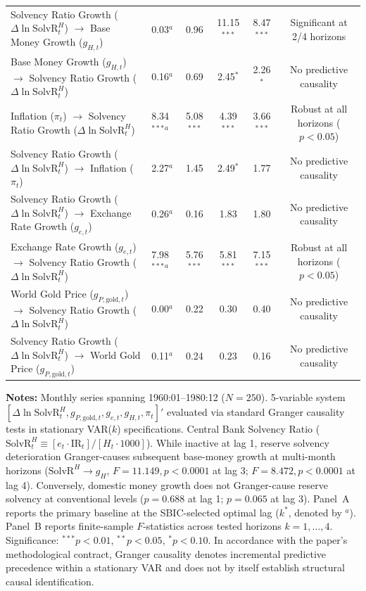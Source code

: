 \begin{table}[htbp]
{\begin{tabular}{llccccc}
\midrule
Solvency Ratio Growth ($\Delta \ln \text{SolvR}_t^H$) $\to$ Base Money Growth ($g_{H,t}$) & 0.03$^a$ & 0.96 & 11.15$^{***}$ & 8.47$^{***}$ & \multicolumn{2}{c}{Significant at 2/4 horizons} \\
Base Money Growth ($g_{H,t}$) $\to$ Solvency Ratio Growth ($\Delta \ln \text{SolvR}_t^H$) & 0.16$^a$ & 0.69 & 2.45$^{*}$ & 2.26$^{*}$ & \multicolumn{2}{c}{No predictive causality} \\
Inflation ($\pi_t$) $\to$ Solvency Ratio Growth ($\Delta \ln \text{SolvR}_t^H$) & 8.34$^{***}$$^a$ & 5.08$^{***}$ & 4.39$^{***}$ & 3.66$^{***}$ & \multicolumn{2}{c}{Robust at all horizons ($p < 0.05$)} \\
Solvency Ratio Growth ($\Delta \ln \text{SolvR}_t^H$) $\to$ Inflation ($\pi_t$) & 2.27$^a$ & 1.45 & 2.49$^{*}$ & 1.77 & \multicolumn{2}{c}{No predictive causality} \\
Solvency Ratio Growth ($\Delta \ln \text{SolvR}_t^H$) $\to$ Exchange Rate Growth ($g_{e,t}$) & 0.26$^a$ & 0.16 & 1.83 & 1.80 & \multicolumn{2}{c}{No predictive causality} \\
Exchange Rate Growth ($g_{e,t}$) $\to$ Solvency Ratio Growth ($\Delta \ln \text{SolvR}_t^H$) & 7.98$^{***}$$^a$ & 5.76$^{***}$ & 5.81$^{***}$ & 7.15$^{***}$ & \multicolumn{2}{c}{Robust at all horizons ($p < 0.05$)} \\
World Gold Price ($g_{P,\text{gold},t}$) $\to$ Solvency Ratio Growth ($\Delta \ln \text{SolvR}_t^H$) & 0.00$^a$ & 0.22 & 0.30 & 0.40 & \multicolumn{2}{c}{No predictive causality} \\
Solvency Ratio Growth ($\Delta \ln \text{SolvR}_t^H$) $\to$ World Gold Price ($g_{P,\text{gold},t}$) & 0.11$^a$ & 0.24 & 0.23 & 0.16 & \multicolumn{2}{c}{No predictive causality} \\
\bottomrule
\end{tabular}%
}
\begin{minipage}{0.96\textwidth}
\vspace{0.3em}
\footnotesize \textbf{Notes:} Monthly series spanning 1960:01--1980:12 ($N=250$). 5-variable system $[\Delta \ln \text{SolvR}_t^H, g_{P,\text{gold},t}, g_{e,t}, g_{H,t}, \pi_t]'$ evaluated via standard Granger causality tests in stationary VAR($k$) specifications. Central Bank Solvency Ratio ($\text{SolvR}_t^H \equiv [e_t \cdot \text{IR}_t] / [H_t \cdot 1000]$). While inactive at lag 1, reserve solvency deterioration Granger-causes subsequent base-money growth at multi-month horizons ($\text{SolvR}^H \to g_H$, $F = 11.149, p < 0.0001$ at lag 3; $F = 8.472, p < 0.0001$ at lag 4). Conversely, domestic money growth does not Granger-cause reserve solvency at conventional levels ($p = 0.688$ at lag 1; $p = 0.065$ at lag 3). Panel~A reports the primary baseline at the SBIC-selected optimal lag ($k^*$, denoted by $^a$). Panel~B reports finite-sample $F$-statistics across tested horizons $k = 1, \dots, 4$. Significance: $^{***} p < 0.01$, $^{**} p < 0.05$, $^{*} p < 0.10$. In accordance with the paper's methodological contract, Granger causality denotes incremental predictive precedence within a stationary VAR and does not by itself establish structural causal identification.
\end{minipage}
\end{table}
